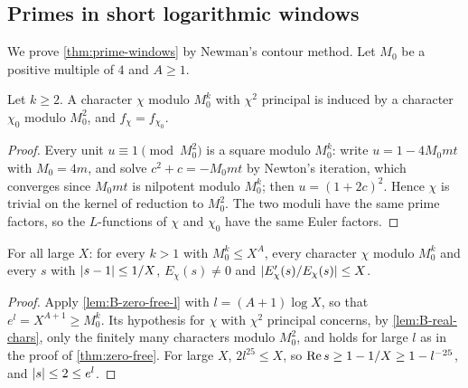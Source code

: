 \subsection{Primes in short logarithmic windows}\label{ss:B-primes}
We prove \cref{thm:prime-windows} by Newman's contour method. Let $M_0$ be a positive multiple of $4$
and $A\ge1$.

\begin{lemma}\label{lem:B-real-chars}
Let $k\ge2$. A character $\chi$ modulo $M_0^k$ with $\chi^2$ principal is induced by a character
$\chi_0$ modulo $M_0^2$, and $f_\chi=f_{\chi_0}$.
\end{lemma}

\begin{proof}
Every unit $u\equiv1\pmod{M_0^2}$ is a square modulo $M_0^k$: write $u=1-4M_0mt$ with $M_0=4m$, and
solve $c^2+c=-M_0mt$ by Newton's iteration, which converges since $M_0mt$ is nilpotent modulo $M_0^k$;
then $u=(1+2c)^2$. Hence $\chi$ is trivial on the kernel of reduction to $M_0^2$. The two moduli have
the same prime factors, so the $L$-functions of $\chi$ and $\chi_0$ have the same Euler factors.
\end{proof}

\begin{lemma}\label{lem:B-near-one}
For all large $X$: for every $k>1$ with $M_0^k\le X^A$, every character $\chi$ modulo $M_0^k$ and every
$s$ with $\lvert s-1\rvert\le1/X$, $E_\chi(s)\ne0$ and $\lvert E_\chi'(s)/E_\chi(s)\rvert\le X$.
\end{lemma}

\begin{proof}
Apply \cref{lem:B-zero-free-l} with $l=(A+1)\log X$, so that $e^l=X^{A+1}\ge M_0^k$. Its hypothesis
for $\chi$ with $\chi^2$ principal concerns, by \cref{lem:B-real-chars}, only the finitely many
characters modulo $M_0^2$, and holds for large $l$ as in the proof of \cref{thm:zero-free}. For large
$X$, $2l^{25}\le X$, so $\operatorname{Re} s\ge1-1/X\ge1-l^{-25}$, and $\lvert s\rvert\le2\le e^l$.
\end{proof}

